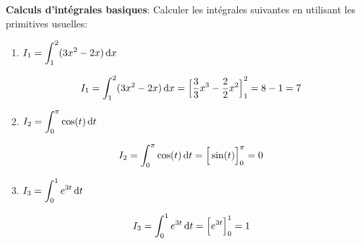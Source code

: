 \documentclass[11pt, a4paper]{report}
\begin{document}
\def\level{BTS}  %
\def\course{CIEL 1}
\def\chaptername{Intégration} %
\def\docname{C107~--~TD 1}        %

\pagestyle{DS_FP}

\NomPrenom{}

\bigskip

 \medskip

\textbf{Calculs d'intégrales basiques}: 
Calculer les intégrales suivantes en utilisant les primitives usuelles:
\begin{enumerate}
    \item $I_1 = \displaystyle\int_{1}^{2} (3x^2 - 2x) \,\mathrm{d}x$
    \begin{blocvisible}[height=2]
        \[I_1 = \int_{1}^{2} (3x^2 - 2x) \,\mathrm{d}x = {\Big[\frac{3}{3}x^3 - \frac{2}{2}x^2 \Big]}_{1}^{2} = 8 - 1 = 7\]
    \end{blocvisible}

    \item $I_2 = \displaystyle\int_{0}^{\pi} \cos(t) \,\mathrm{d}t$
    \begin{blocvisible}[height=2]
        \[I_2 = \int_{0}^{\pi} \cos(t) \,\mathrm{d}t = {\Big[\sin(t) \Big]}_{0}^{\pi} = 0\]
    \end{blocvisible}

    \item $I_3 = \displaystyle\int_{0}^{1} e^{3t} \,\mathrm{d}t$
    \begin{blocvisible}[height=2]
        \[I_3 = \int_{0}^{1} e^{3t} \,\mathrm{d}t = {\Big[e^{3t} \Big]}_{0}^{1} = 1\]
    \end{blocvisible}
\end{enumerate}

\bigskip

 \medskip
\end{document}

